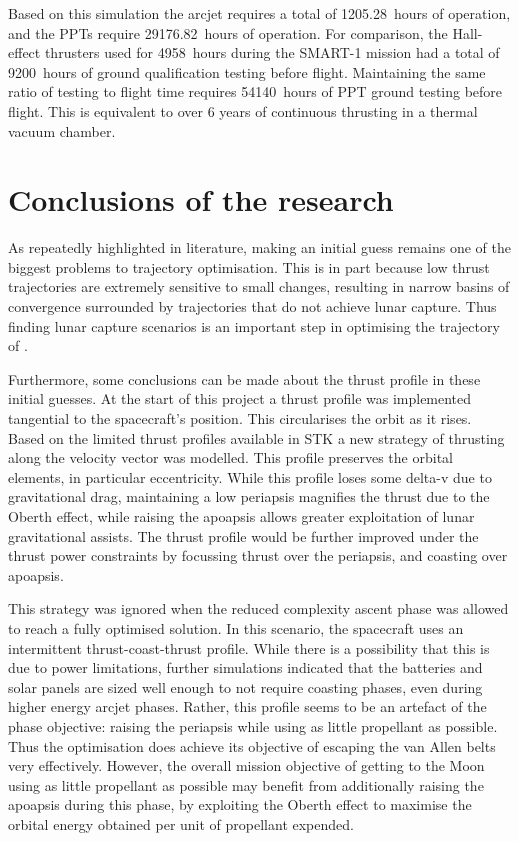 Based on this simulation the arcjet requires a total of 1205.28~hours of operation, and the PPTs require 29176.82~hours of operation. For comparison, the Hall-effect thrusters used for 4958~hours during the SMART-1 mission had a total of 9200~hours of ground qualification testing before flight. Maintaining the same ratio of testing to flight time requires 54140~hours of PPT ground testing before flight. This is equivalent to over 6 years of continuous thrusting in a thermal vacuum chamber. 




\section{Conclusions of the research}

As repeatedly highlighted in literature, making an initial guess remains one of the biggest problems to trajectory optimisation. This is in part because low thrust trajectories are extremely sensitive to small changes, resulting in narrow basins of convergence surrounded by trajectories that do not achieve lunar capture. Thus finding lunar capture scenarios is an important step in optimising the trajectory of \BW.

Furthermore, some conclusions can be made about the thrust profile in these initial guesses. At the start of this project a thrust profile was implemented tangential to the spacecraft's position. This circularises the orbit as it rises. Based on the limited thrust profiles available in STK a new strategy of thrusting along the velocity vector was modelled. This profile preserves the orbital elements, in particular eccentricity. While this profile loses some delta-v due to gravitational drag, maintaining a low periapsis magnifies the thrust due to the Oberth effect, while raising the apoapsis allows greater exploitation of lunar gravitational assists. The thrust profile would be further improved under the thrust power constraints by focussing thrust over the periapsis, and coasting over apoapsis.

This strategy was ignored when the reduced complexity ascent phase was allowed to reach a fully optimised solution. In this scenario, the spacecraft uses an intermittent thrust-coast-thrust profile. While there is a possibility that this is due to power limitations, further simulations indicated that the batteries and solar panels are sized well enough to not require coasting phases, even during higher energy arcjet phases. Rather, this profile seems to be an artefact of the phase objective: raising the periapsis while using as little propellant as possible. Thus the optimisation does achieve its objective of escaping the van Allen belts very effectively. However, the overall mission objective of getting to the Moon using as little propellant as possible may benefit from additionally raising the apoapsis during this phase, by exploiting the Oberth effect to maximise the orbital energy obtained per unit of propellant expended.

